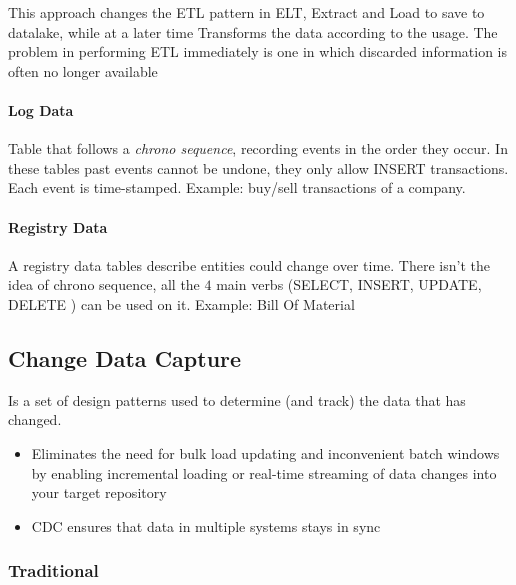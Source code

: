This approach changes the ETL pattern in ELT, Extract and Load to save to datalake, while at a later time Transforms the data according to the usage. The problem in performing ETL immediately is one in which discarded information is often no longer available

\paragraph{Log Data}
Table that follows a \textit{chrono sequence}, recording events in the order they occur. In these tables past events cannot be undone, they only allow INSERT transactions. Each event is time-stamped. Example: buy/sell transactions of a company.

\paragraph{Registry Data}
A registry data tables describe entities could change over time. There isn’t the idea of chrono sequence, all the
$4$ main verbs (SELECT, INSERT, UPDATE, DELETE ) can be used on it. Example: Bill Of Material 

\subsection{Change Data Capture}
Is a set of design patterns used to determine (and track) the data that has changed.
\begin{itemize}
    \item Eliminates the need for bulk load updating and inconvenient batch windows by enabling incremental loading or real-time streaming of data changes into your target repository
    \item CDC ensures that data in multiple systems stays in sync
\end{itemize}

\subsubsection{Traditional}

